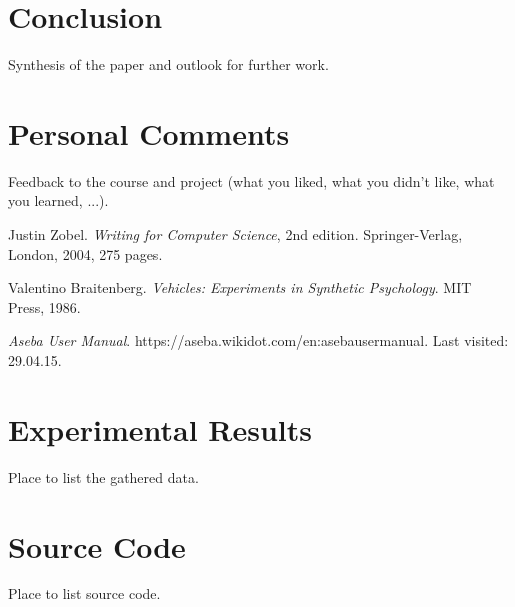 \documentclass[12pt,a4paper]{article}
\begin{document}
\section*{Conclusion}
Synthesis of the paper and outlook for further work.

\section*{Personal Comments}
Feedback to the course and project (what you liked, what you didn't like, what you learned, ...).

\begin{thebibliography}{20}
Justin Zobel.											%
\textit{Writing for Computer Science}, 2nd edition.		%
Springer-Verlag, London, 2004, 275 pages.				%

Valentino Braitenberg.									%
\textit{Vehicles: Experiments in Synthetic Psychology}.	%
MIT Press, 1986.										%

\textit{Aseba User Manual}.										%
https://aseba.wikidot.com/en:asebausermanual.			%
Last visited: 29.04.15.									%
\end{thebibliography}
\appendix
\renewcommand{\thesection}{Appendix \Alph{section}}
\renewcommand{\thesubsection}{\Alph{section}.\arabic{subsection}}

\clearpage

\section{Experimental Results}
Place to list the gathered data.

\section{Source Code} \label{app:sourceCode}
Place to list source code.
\end{document}
